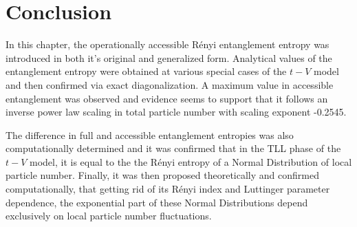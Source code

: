 \section{Conclusion}
In this chapter, the operationally accessible R\'enyi entanglement entropy was introduced in both it's original and generalized form. Analytical values of the entanglement entropy were obtained at various special cases of the $t-V$ model and then confirmed via exact diagonalization. A maximum value in accessible entanglement was observed and evidence seems to support that it follows an inverse power law scaling in total particle number with scaling exponent -0.2545. 

The difference in full and accessible entanglement entropies was also computationally determined and it was confirmed that in the TLL phase of the $t-V$ model, it is equal to the the R\'enyi entropy of a Normal Distribution of local particle number. Finally, it was then proposed theoretically and confirmed computationally, that getting rid of its R\'enyi index and Luttinger parameter dependence, the exponential part of these Normal Distributions depend exclusively on local particle number fluctuations.


